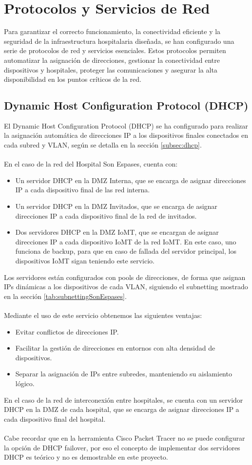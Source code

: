 \section{Protocolos y Servicios de Red}
Para garantizar el correcto funcionamiento, la conectividad eficiente y la seguridad de la infraestructura hospitalaria diseñada, se han configurado una serie de protocolos 
de red y servicios esenciales. Estos protocolos permiten automatizar la asignación de direcciones, gestionar la conectividad entre dispositivos y hospitales, proteger las 
comunicaciones y asegurar la alta disponibilidad en los puntos críticos de la red.

\subsection{Dynamic Host Configuration Protocol (DHCP)}
El Dynamic Host Configuration Protocol (DHCP) se ha configurado para realizar la asignación automática de direcciones IP a los dispositivos finales conectados en cada subred y VLAN, según se detalla en la sección \ref{subsec:dhcp}.
\\ \\
En el caso de la red del Hospital Son Espases, cuenta con:
\begin{itemize}
    \item Un servidor DHCP en la DMZ Interna, que se encarga de asignar direcciones IP a cada dispositivo final de las red interna.
    \item Un servidor DHCP en la DMZ Invitados, que se encarga de asignar direcciones IP a cada dispositivo final de la red de invitados.
    \item Dos servidores DHCP en la DMZ IoMT, que se encargan de asignar direcciones IP a cada dispositivo IoMT de la red IoMT. En este caso, uno funciona de backup, para que en caso de fallada del servidor principal, los dispositivos IoMT sigan teniendo este servicio.
\end{itemize}
Los servidores están configurados con pools de direcciones, de forma que asignan IPs dinámicas a los dispositivos de cada VLAN, siguiendo el subnetting mostrado en la sección \ref{tab:subnettingSonEspases}.
\\ \\
Mediante el uso de este servicio obtenemos las siguientes ventajas:
\begin{itemize}
    \item Evitar conflictos de direcciones IP.
    \item Facilitar la gestión de direcciones en entornos con alta densidad de dispositivos.
    \item Separar la asignación de IPs entre subredes, manteniendo su aislamiento lógico.
\end{itemize}
En el caso de la red de interconexión entre hospitales, se cuenta con un servidor DHCP en la DMZ de cada hospital, que se encarga de asignar direcciones IP a cada dispositivo final del hospital. \\ \\
Cabe recordar que en la herramienta Cisco Packet Tracer no se puede configurar la opción de DHCP failover, por eso el concepto de implementar dos servidores DHCP es teórico y no es demostrable en este proyecto.

